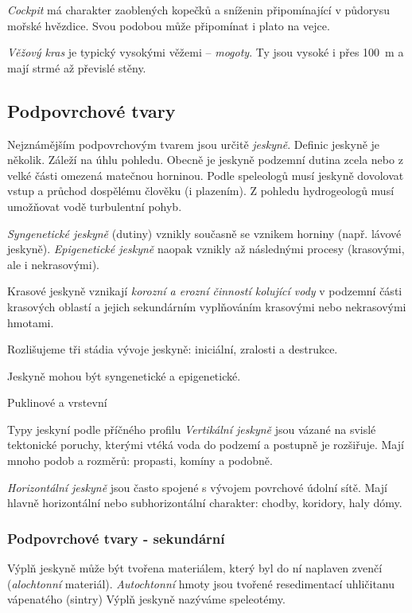 \emph{Cockpit} má charakter zaoblených kopečků a sníženin připomínající v půdorysu mořské hvězdice. Svou podobou může připomínat i plato na vejce. 

\emph{Věžový kras} je typický vysokými věžemi -- \emph{mogoty}. Ty jsou vysoké i přes \SI{100}{\metre} a mají strmé až převislé stěny. 



\subsection{Podpovrchové tvary}
Nejznámějším podpovrchovým tvarem jsou určitě \emph{jeskyně}. Definic jeskyně je několik. Záleží na úhlu pohledu. Obecně je jeskyně podzemní dutina zcela nebo z velké části omezená matečnou horninou. Podle speleologů musí jeskyně dovolovat vstup a průchod dospělému člověku (i plazením). Z pohledu hydrogeologů musí umožňovat vodě turbulentní pohyb.

\emph{Syngenetické jeskyně} (dutiny) vznikly současně se vznikem horniny (např. lávové jeskyně).  \emph{Epigenetické jeskyně} naopak vznikly až následnými procesy (krasovými, ale i nekrasovými). 

Krasové jeskyně vznikají \emph{korozní a erozní činností kolující vody} v podzemní části krasových oblastí a jejich sekundárním vyplňováním krasovými nebo nekrasovými hmotami.

Rozlišujeme tři stádia vývoje jeskyně: iniciální, zralosti a destrukce.

Jeskyně mohou být syngenetické a epigenetické.

Puklinové a vrstevní

Typy jeskyní podle příčného profilu
\emph{Vertikální jeskyně} jsou vázané na svislé tektonické poruchy, kterými vtéká voda do podzemí a postupně je rozšiřuje. Mají mnoho podob a rozměrů: propasti, komíny a podobně.

\emph{Horizontální jeskyně} jsou často spojené s vývojem povrchové údolní sítě. Mají hlavně horizontální nebo subhorizontální charakter: chodby, koridory, haly dómy. 

%
\subsubsection{Podpovrchové tvary - sekundární}
Výplň jeskyně může být tvořena materiálem, který byl do ní naplaven zvenčí (\emph{alochtonní} materiál). \emph{Autochtonní} hmoty jsou tvořené resedimentací uhličitanu vápenatého (sintry) Výplň jeskyně nazýváme speleotémy. 

